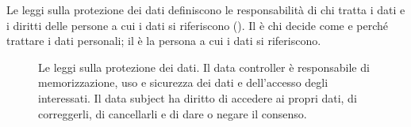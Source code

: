 Le leggi sulla protezione dei dati definiscono le responsabilità di chi tratta i dati e i diritti delle persone a cui i
dati si riferiscono (). Il  è chi decide come e perché trattare i dati
personali; il  è la persona a cui i dati si riferiscono.

\begin{figure}[ht]
\centering
{}
\caption{Le leggi sulla protezione dei dati. Il data controller è responsabile di memorizzazione, uso e sicurezza dei
dati e dell'accesso degli interessati. Il data subject ha diritto di accedere ai propri dati, di correggerli, di
cancellarli e di dare o negare il consenso.}
\label{fig:sic-leggi}
\end{figure}

